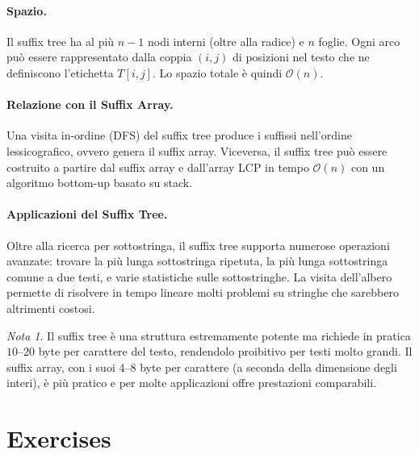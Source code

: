 \documentclass[12pt, a4paper, oneside]{book}
\theoremstyle{plain}
\theoremstyle{definition}
\theoremstyle{remark}
\newtheorem{nota}[teorema]{Nota}
\newcommand{\OO}[1]{\mathcal{O}\!\left(#1\right)}
\begin{document}
\paragraph{Spazio.} Il suffix tree ha al più $n - 1$ nodi interni (oltre alla radice) e $n$ foglie. Ogni arco può essere rappresentato dalla coppia $(i, j)$ di posizioni nel testo che ne definiscono l'etichetta $T[i,j]$. Lo spazio totale è quindi $\OO{n}$.

\paragraph{Relazione con il Suffix Array.} Una visita in-ordine (DFS) del suffix tree produce i suffissi nell'ordine lessicografico, ovvero genera il suffix array. Viceversa, il suffix tree può essere costruito a partire dal suffix array e dall'array LCP in tempo $\OO{n}$ con un algoritmo bottom-up basato su stack.

\paragraph{Applicazioni del Suffix Tree.} Oltre alla ricerca per sottostringa, il suffix tree supporta numerose operazioni avanzate: trovare la più lunga sottostringa ripetuta, la più lunga sottostringa comune a due testi, e varie statistiche sulle sottostringhe. La visita dell'albero permette di risolvere in tempo lineare molti problemi su stringhe che sarebbero altrimenti costosi.

\begin{nota}
Il suffix tree è una struttura estremamente potente ma richiede in pratica $10$--$20$ byte per carattere del testo, rendendolo proibitivo per testi molto grandi. Il suffix array, con i suoi $4$--$8$ byte per carattere (a seconda della dimensione degli interi), è più pratico e per molte applicazioni offre prestazioni comparabili.
\end{nota}

\section{Exercises}
\end{document}
